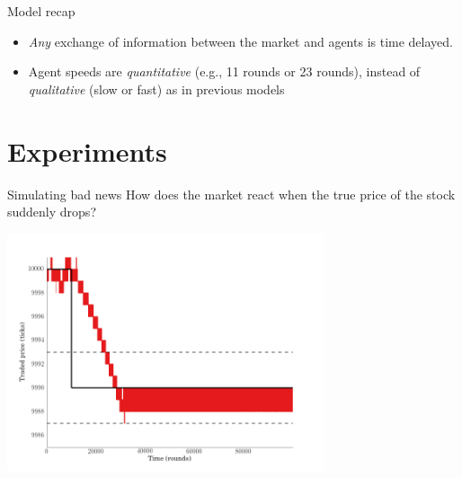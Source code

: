 \documentclass[14pt]{beamer}
\begin{document}
\begin{frame}{Model recap}
\begin{itemize}
\item \textit{Any} exchange of information between the market and agents is time delayed.
\vspace{0.1in}
\item Agent speeds are \textit{quantitative} (e.g., 11 rounds or 23 rounds), instead of \textit{qualitative} (slow or fast) as in previous models
\end{itemize}
\end{frame}

\section{Experiments}
\begin{frame}
\tableofcontents[currentsection]
\end{frame}


\begin{frame}{Simulating bad news}
How does the market react when the true price of the stock suddenly drops?
\begin{center}
\includegraphics[width=0.7\textwidth]{market_cases/a_stable_within_margin.png}
\end{center}
\end{frame}
\end{document}
